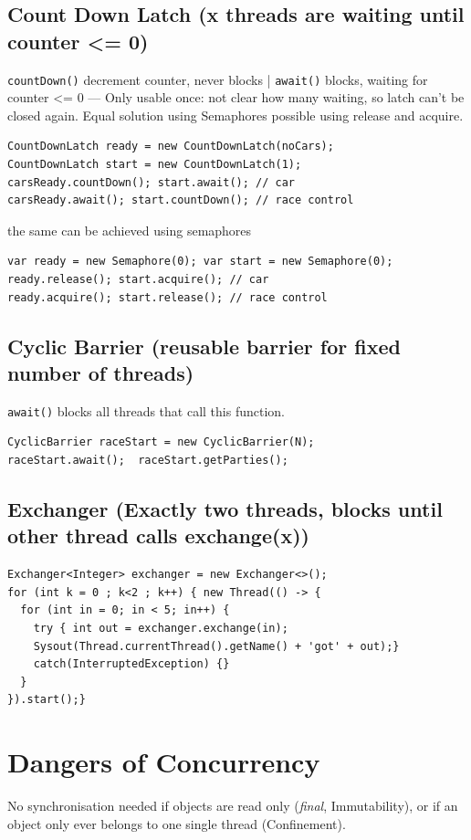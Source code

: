 \subsection{Count Down Latch (x threads are waiting until counter <= 0)}
\texttt{countDown()} decrement counter, never blocks | \texttt{await()} blocks, waiting for counter <= 0 ---
Only usable once: not clear how many waiting, so latch can't be closed again.
Equal solution using Semaphores possible using release and acquire.

\begin{lstlisting}[style=java]
CountDownLatch ready = new CountDownLatch(noCars);
CountDownLatch start = new CountDownLatch(1);
carsReady.countDown(); start.await(); // car
carsReady.await(); start.countDown(); // race control
\end{lstlisting}
the same can be achieved using semaphores
\begin{lstlisting}[style=java]
var ready = new Semaphore(0); var start = new Semaphore(0);
ready.release(); start.acquire(); // car
ready.acquire(); start.release(); // race control 
\end{lstlisting}

\subsection{Cyclic Barrier (reusable barrier for fixed number of threads)}
\lstinline|await()| blocks all threads that call this function. 

\begin{lstlisting}[style=java]
CyclicBarrier raceStart = new CyclicBarrier(N); 
raceStart.await();  raceStart.getParties(); 
\end{lstlisting}

\subsection{Exchanger (Exactly two threads, blocks until other thread calls exchange(x))}
\begin{lstlisting}[style=java]
Exchanger<Integer> exchanger = new Exchanger<>(); 
for (int k = 0 ; k<2 ; k++) { new Thread(() -> {
  for (int in = 0; in < 5; in++) { 
    try { int out = exchanger.exchange(in); 
    Sysout(Thread.currentThread().getName() + 'got' + out);} 
    catch(InterruptedException) {} 
  }
}).start();}
\end{lstlisting}

\section{Dangers of Concurrency}
No synchronisation needed if objects are read only (\textit{final}, Immutability), or if an object only ever belongs to one single thread (Confinement). 

